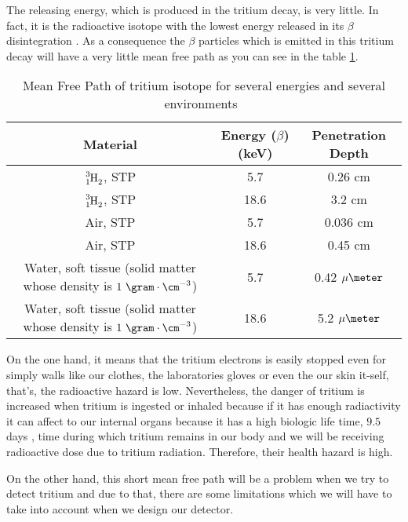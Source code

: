 The releasing energy, which is produced in the tritium decay, is very little. In fact, it is the radioactive isotope with the lowest energy released in its $\beta$ disintegration \cite{TritiumHandling}. As a consequence the $\beta$ particles which is emitted in this tritium decay will have a very little mean free path as you can see in the table \ref{tab:MeanFreePathTritium}.

\begin{table}[htbp]
\begin{center}
\begin{tabular}{|c|c|c|}
\hline
Material & Energy ($\beta$)(keV) & Penetration Depth \\
\hline \hline \hline
$\ce{\ce{^{3}_{1}H_2}}$, STP & 5.7 & 0.26 cm \\ \hline
$\ce{\ce{^{3}_{1}H_2}}$, STP & 18.6 & 3.2 cm \\ \hline
Air, STP & 5.7 & 0.036 cm \\ \hline
Air, STP & 18.6 & 0.45 cm \\ \hline
\parbox{10em}{\centering Water, soft tissue\\  (solid matter whose \\  density is $1~\gram\cdot\cm^{-3}$)} & 5.7 & 0.42 $\mu\meter$\\ \hline
\parbox{10em}{\centering Water, soft tissue\\  (solid matter whose \\  density is $1~\gram\cdot\cm^{-3}$)} & 18.6 & 5.2 $\mu\meter$ \\ \hline
\end{tabular}
\caption{Mean Free Path of tritium isotope for several energies and several environments~\cite{TritiumHandling}}
\label{tab:MeanFreePathTritium}
\end{center}
\end{table}

On the one hand, it means that the tritium electrons is easily stopped even for simply walls like our clothes, the laboratories gloves or even the our skin it-self, that's, the radioactive hazard is low. Nevertheless, the danger of tritium is increased when tritium is ingested or inhaled because if it has enough radiactivity it can affect to our internal organs because it has a high biologic life time, $9.5$ days \cite{TritiumHandling}, time during which tritium remains in our body and we will be receiving radioactive dose due to tritium radiation. Therefore, their health hazard is high.

On the other hand, this short mean free path will be a problem when we try to detect tritium and due to that, there are some limitations which we will have to take into account when we design our detector. 

